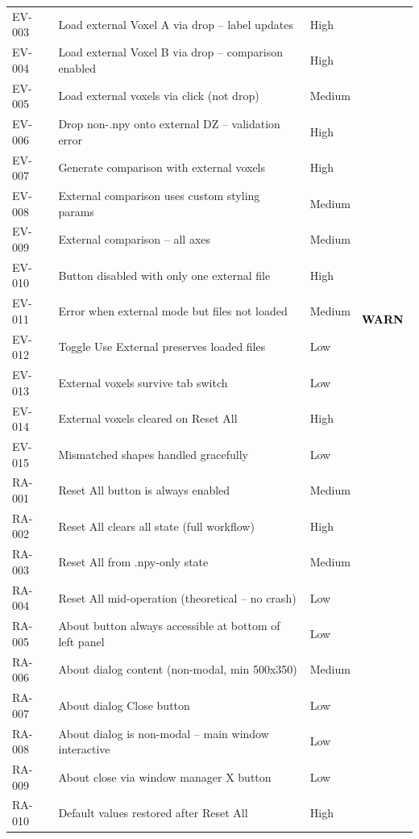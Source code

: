 \documentclass[12pt,a4paper]{article}
\newcommand{\statuspass}{\colorbox{statusgreen}{\textcolor{white}{\textbf{\,PASS\,}}}}
\newcommand{\statuswarn}{\colorbox{statusyellow}{\textcolor{black}{\textbf{\,WARN\,}}}}
\begin{document}
{\begin{longtable}{p{1.7cm}p{7.7cm}p{1.3cm}p{2cm}}
EV-003 & Load external Voxel A via drop -- label updates & High & \statuspass \\
EV-004 & Load external Voxel B via drop -- comparison enabled & High & \statuspass \\
EV-005 & Load external voxels via click (not drop) & Medium & \statuspass \\
EV-006 & Drop non-.npy onto external DZ -- validation error & High & \statuspass \\
EV-007 & Generate comparison with external voxels & High & \statuspass \\
EV-008 & External comparison uses custom styling params & Medium & \statuspass \\
EV-009 & External comparison -- all axes & Medium & \statuspass \\
EV-010 & Button disabled with only one external file & High & \statuspass \\
EV-011 & Error when external mode but files not loaded & Medium & \statuswarn \\
EV-012 & Toggle Use External preserves loaded files & Low & \statuspass \\
EV-013 & External voxels survive tab switch & Low & \statuspass \\
EV-014 & External voxels cleared on Reset All & High & \statuspass \\
EV-015 & Mismatched shapes handled gracefully & Low & \statuspass \\
RA-001 & Reset All button is always enabled & Medium & \statuspass \\
RA-002 & Reset All clears all state (full workflow) & High & \statuspass \\
RA-003 & Reset All from .npy-only state & Medium & \statuspass \\
RA-004 & Reset All mid-operation (theoretical -- no crash) & Low & \statuspass \\
RA-005 & About button always accessible at bottom of left panel & Low & \statuspass \\
RA-006 & About dialog content (non-modal, min 500x350) & Medium & \statuspass \\
RA-007 & About dialog Close button & Low & \statuspass \\
RA-008 & About dialog is non-modal -- main window interactive & Low & \statuspass \\
RA-009 & About close via window manager X button & Low & \statuspass \\
RA-010 & Default values restored after Reset All & High & \statuspass \\

\end{longtable}}
\end{document}
